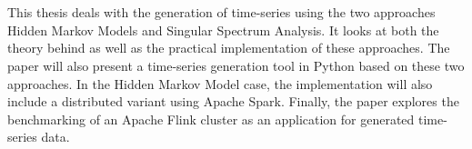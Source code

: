 \chapter{\abstractname}



This thesis deals with the generation of time-series using the two approaches Hidden Markov Models and Singular Spectrum Analysis. It looks at both the theory behind as well as the practical implementation of these approaches. The paper will also present a time-series generation tool in Python based on these two approaches. In the Hidden Markov Model case, the implementation will also include a distributed variant using Apache Spark. Finally, the paper explores the benchmarking of an Apache Flink cluster as an application for generated time-series data. 